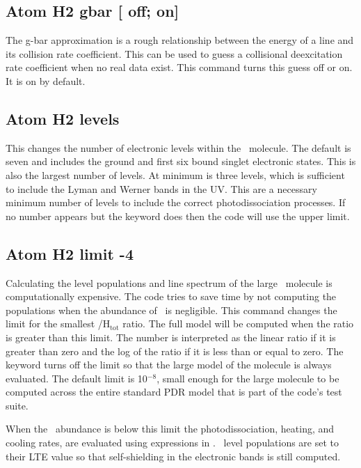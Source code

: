 \subsection{Atom H2 gbar [ off; on]}

The g-bar approximation is a rough relationship between the energy of
a line and its collision rate coefficient.  This can be used to guess a
collisional deexcitation rate coefficient when no real data exist.
This command turns this guess off or on.  It is on by default.

\subsection{Atom H2 levels }

This changes the number of electronic levels within the \htwo\ molecule.
The default is seven and includes the ground and first six bound singlet
electronic states.
This is also the largest number of levels.  At minimum
is three levels, which is sufficient to include the Lyman and Werner bands
in the UV.
This are a necessary minimum number of levels to include the
correct photodissociation processes.
If no number appears but the keyword
 does then the code will use the upper limit.

\subsection{Atom H2 limit -4  }

Calculating the level populations and line spectrum of the large \htwo\ molecule is computationally expensive.
The code tries to save time by not
computing the populations when the abundance of \htwo\ is negligible.  This
command changes the limit for the smallest \htwo/H$_{\mathrm{tot}}$ ratio.
The full model
will be computed when the ratio is greater than this limit.
The number
is interpreted as the linear ratio if it is greater than zero and the log
of the ratio if it is less than or equal to zero.
The keyword
 turns
off the limit so that the large model of the molecule is always evaluated.
The default limit is 10$^{-8}$, small enough for the large molecule to be
computed across the entire \citet{Tielens1985a} standard PDR
model that is part of the code's test suite.

When the \htwo\ abundance is below this limit the photodissociation,
heating, and cooling rates, are evaluated using expressions in
\citet{Tielens1985a}.
\htwo\ level populations are set to their LTE value so that
self-shielding in the electronic bands is still computed.

